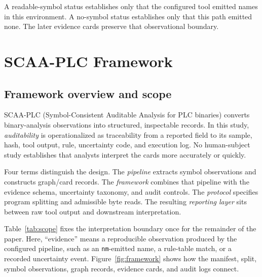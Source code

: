 \documentclass[manuscript,screen,review]{acmart}
\begin{document}
A readable-symbol status establishes only that the configured tool emitted names in this environment. A no-symbol status establishes only that this path emitted none. The later evidence cards preserve that observational boundary.



\section{SCAA-PLC Framework}

\subsection{Framework overview and scope}

SCAA-PLC (Symbol-Consistent Auditable Analysis for PLC binaries) converts binary-analysis observations into structured, inspectable records. In this study, \emph{auditability} is operationalized as traceability from a reported field to its sample, hash, tool output, rule, uncertainty code, and execution log. No human-subject study establishes that analysts interpret the cards more accurately or quickly.

Four terms distinguish the design. The \emph{pipeline} extracts symbol observations and constructs graph/card records. The \emph{framework} combines that pipeline with the evidence schema, uncertainty taxonomy, and audit controls. The \emph{protocol} specifies program splitting and admissible byte reads. The resulting \emph{reporting layer} sits between raw tool output and downstream interpretation.

Table~\ref{tab:scope} fixes the interpretation boundary once for the remainder of the paper. Here, ``evidence'' means a reproducible observation produced by the configured pipeline, such as an \texttt{nm}-emitted name, a rule-table match, or a recorded uncertainty event. Figure~\ref{fig:framework} shows how the manifest, split, symbol observations, graph records, evidence cards, and audit logs connect.
\end{document}
